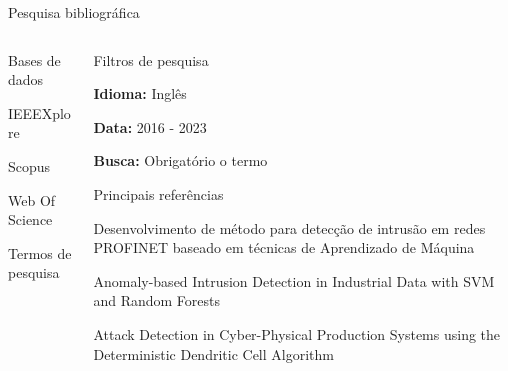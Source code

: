 \documentclass{uspBeamer}
\begin{document}
    \begin{frame}{Pesquisa bibliográfica}
        \begin{columns}
            \begin{column}{0.4\textwidth}
                \begin{wideitemize}
                    \item Bases de dados
                    \begin{wideitemize}
                        \item IEEEXplore
                        \item Scopus
                        \item Web Of Science
                    \end{wideitemize}
                    \item Termos de pesquisa
                    \begin{wideitemize}
                        \item {}
                        \item {}
                        \item {}
                        \item {}
                    \end{wideitemize}
                \end{wideitemize}
            \end{column}
            \begin{column}{0.6\textwidth}
                \begin{wideitemize}
                    \item Filtros de pesquisa
                    \begin{wideitemize}
                        \item \textbf{Idioma:} Inglês
                        \item \textbf{Data:} 2016 - 2023
                        \item \textbf{Busca:} Obrigatório o termo 
                    \end{wideitemize}
                    \item Principais referências
                    \begin{wideitemize}
                        \item Desenvolvimento de método para detecção de intrusão em redes PROFINET baseado em técnicas de Aprendizado de Máquina \cite{turcato2020}
                        \item Anomaly-based Intrusion Detection in Industrial Data with SVM and Random Forests \cite{anton2019}
                        \item Attack Detection in Cyber-Physical Production Systems using the Deterministic Dendritic Cell Algorithm \cite{pinto2020}
                    \end{wideitemize}
                \end{wideitemize}
            \end{column}
        \end{columns}
    \end{frame}
\end{document}
